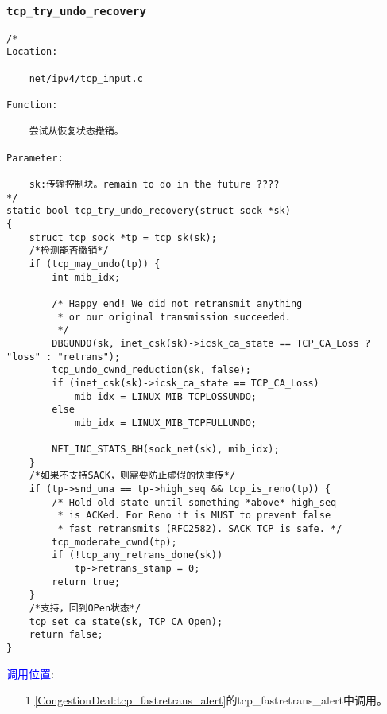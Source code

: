         \subsubsection{\texttt{tcp_try_undo_recovery}}
            \label{CongestionControlWindowUndo:tcp_try_undo_recovery}
\begin{verbatim}
/* 
Location:

    net/ipv4/tcp_input.c

Function:

    尝试从恢复状态撤销。

Parameter:

    sk:传输控制块。remain to do in the future ????
*/
static bool tcp_try_undo_recovery(struct sock *sk)
{
    struct tcp_sock *tp = tcp_sk(sk);
    /*检测能否撤销*/
    if (tcp_may_undo(tp)) {
        int mib_idx;

        /* Happy end! We did not retransmit anything
         * or our original transmission succeeded.
         */
        DBGUNDO(sk, inet_csk(sk)->icsk_ca_state == TCP_CA_Loss ? "loss" : "retrans");
        tcp_undo_cwnd_reduction(sk, false);
        if (inet_csk(sk)->icsk_ca_state == TCP_CA_Loss)
            mib_idx = LINUX_MIB_TCPLOSSUNDO;
        else
            mib_idx = LINUX_MIB_TCPFULLUNDO;

        NET_INC_STATS_BH(sock_net(sk), mib_idx);
    }
    /*如果不支持SACK，则需要防止虚假的快重传*/
    if (tp->snd_una == tp->high_seq && tcp_is_reno(tp)) {
        /* Hold old state until something *above* high_seq
         * is ACKed. For Reno it is MUST to prevent false
         * fast retransmits (RFC2582). SACK TCP is safe. */
        tcp_moderate_cwnd(tp);
        if (!tcp_any_retrans_done(sk))
            tp->retrans_stamp = 0;
        return true;
    }
    /*支持，回到OPen状态*/
    tcp_set_ca_state(sk, TCP_CA_Open);
    return false;
}
\end{verbatim}

        \textcolor{blue}{调用位置}:

            \begin{enumerate}
                \item[1]        \ref{CongestionDeal:tcp_fastretrans_alert}的tcp\_fastretrans\_alert中调用。
            \end{enumerate}

